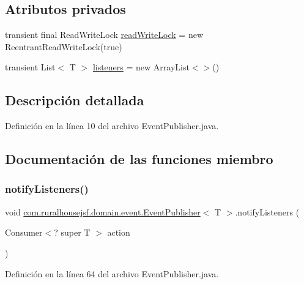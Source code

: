 \subsection*{Atributos privados}
\begin{DoxyCompactItemize}
\item 
transient final Read\+Write\+Lock \mbox{\hyperlink{a00168_a5fc44b6d9dfee072080a75909bc6ac8d}{read\+Write\+Lock}} = new Reentrant\+Read\+Write\+Lock(true)
\item 
transient List$<$ T $>$ \mbox{\hyperlink{a00168_a7d451510f2e915561f219dd4e07eeed6}{listeners}} = new Array\+List$<$$>$()
\end{DoxyCompactItemize}


\subsection{Descripción detallada}


Definición en la línea 10 del archivo Event\+Publisher.\+java.



\subsection{Documentación de las funciones miembro}
\mbox{\label{a00168_a7bd776be1bff02b358cfae8b22f33b73}} 
\subsubsection{\texorpdfstring{notifyListeners()}{notifyListeners()}}
{\footnotesize\ttfamily void \mbox{\hyperlink{a00168}{com.\+ruralhousejsf.\+domain.\+event.\+Event\+Publisher}}$<$ T $>$.notify\+Listeners (\begin{DoxyParamCaption}\item[{Consumer$<$? super T $>$}]{action }\end{DoxyParamCaption})}



Definición en la línea 64 del archivo Event\+Publisher.\+java.

\mbox{\label{a00168_a65329dd472a54e80c4f024ae2d30f5c2}} 
